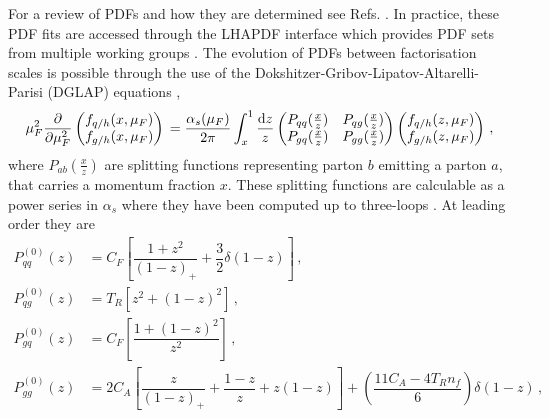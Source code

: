 \documentclass[main.tex]{subfiles}
\begin{document}
    For a review of PDFs and how they are determined
    see Refs. \cite{Ethier:2020way,Jimenez-Delgado:2013sma}.
    In practice, these PDF fits are accessed through the
    LHAPDF interface \cite{Buckley:2014ana} which provides
    PDF sets from multiple working groups \cite{PDF4LHCWorkingGroup:2022cjn,Hou:2019efy,Bailey:2020ooq,NNPDF:2021njg}.
    The evolution of PDFs between factorisation scales is possible
    through the use of the Dokshitzer-Gribov-Lipatov-Altarelli-Parisi (DGLAP)
    equations \cite{Dokshitzer:1977sg,Gribov:1972ri,Lipatov:1974qm,Altarelli:1977zs},
    \begin{equation}\label{eqn:DGLAP}
        \mu_{F}^{2} \dfrac{\partial}{\partial \mu_{F}^{2}}
        \begin{pmatrix}
            f_{q/h}(x,\mu_{F}) \\
            f_{g/h}(x,\mu_{F})
        \end{pmatrix} \\
        = \dfrac{\alpha_{s}(\mu_{F})}{2\pi} \int_{x}^{1} \dfrac{\mathrm{d}z}{z}
        \begin{pmatrix}
            P_{qq}(\frac{x}{z}) & P_{qg}(\frac{x}{z}) \\
            P_{gq}(\frac{x}{z}) & P_{gg}(\frac{x}{z})
        \end{pmatrix}
        \begin{pmatrix}
            f_{q/h}(z,\mu_{F}) \\
            f_{g/h}(z,\mu_{F})
        \end{pmatrix} \, ,
    \end{equation}
    where $P_{ab}(\frac{x}{z})$ are splitting functions
    representing parton $b$ emitting a parton $a$, that carries
    a momentum fraction $x$. These splitting functions are calculable
    as a power series in $\alpha_{s}$ where they have been computed
    up to three-loops \cite{Moch:2004pa,Vogt:2004mw}.
    At leading order they are \cite{Altarelli:1977zs}
    \begin{equation}\label{eqn:AP_kernels}
        \begin{split}
            P^{(0)}_{qq}(z) &= C_{F}\left[\dfrac{1+z^{2}}{(1-z)_{+}} + \dfrac{3}{2}\delta(1-z)\right] \, , \\
            P^{(0)}_{qg}(z) &= T_{R}\left[z^{2} + (1-z)^{2}\right] \, ,\\
            P^{(0)}_{gq}(z) &= C_{F}\left[\dfrac{1+(1-z)^{2}}{z^{2}}\right] \, ,\\
            P^{(0)}_{gg}(z) &= 2C_{A}\left[\dfrac{z}{(1-z)_{+}}+\dfrac{1-z}{z}+z(1-z)\right] + \left(\dfrac{11C_{A}-4T_{R}n_{f}}{6}\right)\delta(1-z) \, ,
        \end{split}
    \end{equation}
\end{document}
